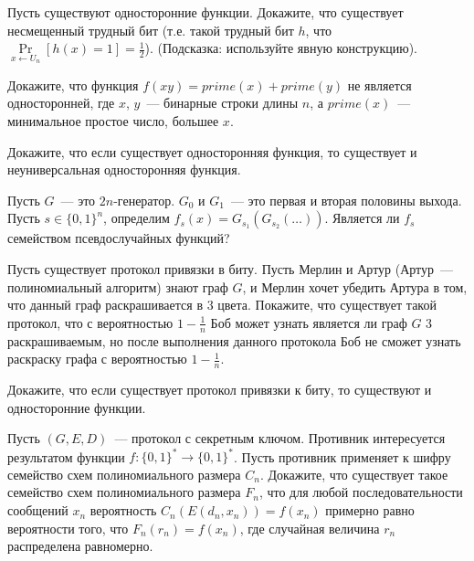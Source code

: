 \setcounter{curtask}{36}


\begin{task}
    Пусть существуют односторонние функции. Докажите, что существует несмещенный
    трудный бит (т.е. такой трудный бит $h$, что $\Pr\limits_{x \gets U_n}[h(x) = 1]
    = \frac{1}{2}$). (Подсказка: используйте явную конструкцию). 
\end{task}

\breakline

\begin{ptask}{12}
    Докажите, что функция $f(xy) = prime(x) + prime(y)$ не является односторонней,
    где $x$, $y$~--- бинарные строки длины $n$, а $prime(x)$~--- минимальное простое
    число, большее $x$.
\end{ptask}

\begin{ptask}{28}
    Докажите, что если существует односторонняя функция, то существует и
    неуниверсальная односторонняя функция.
\end{ptask}

\begin{ptask}{31}
    Пусть $G$~--- это $2n$-генератор. $G_0$ и $G_1$~--- это первая и вторая половины
    выхода. Пусть $s \in \{0, 1\}^n$, определим $f_s(x) =
    G_{s_1}(G_{s_2}(\dots))$. Является ли $f_s$ семейством псевдослучайных функций?
\end{ptask}


\begin{ptask}{33}
    Пусть существует протокол привязки в биту. Пусть Мерлин и Артур (Артур~---
    полиномиальный алгоритм) знают граф $G$, и Мерлин хочет убедить Артура в том, что
    данный граф раскрашивается в $3$ цвета. Покажите, что существует такой протокол,
    что с вероятностью $1 - \frac{1}{n}$ Боб может узнать является ли граф $G$ $3$
    раскрашиваемым, но после выполнения данного протокола Боб не сможет узнать
    раскраску графа с вероятностью $1 - \frac{1}{n}$.
\end{ptask}

\begin{ptask}{34}
    Докажите, что если существует протокол привязки к биту, то существуют и
    односторонние функции.
\end{ptask}

\begin{ptask}{35}
    Пусть $(G, E, D)$~--- протокол с секретным ключом. Противник интересуется
    результатом функции $f: \{0, 1\}^* \to \{0, 1\}^*$. Пусть противник применяет к
    шифру семейство схем полиномиального размера $C_n$. Докажите, что существует
    такое семейство схем полиномиального размера $F_n$, что для любой
    последовательности сообщений $x_n$ вероятность $C_n(E(d_n, x_n)) = f(x_n)$
    примерно равно вероятности того, что $F_n(r_n) = f(x_n)$, где случайная величина
    $r_n$ распределена равномерно.
\end{ptask}